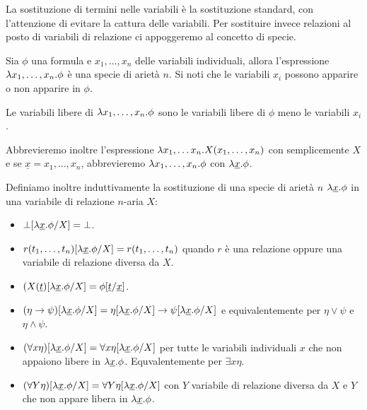 \documentclass[]{marticle}
\begin{document}
La sostituzione di termini nelle variabili \`e la sostituzione standard, con
l'attenzione di evitare la cattura delle variabili. Per sostituire invece
relazioni al posto di variabili di relazione ci appoggeremo al concetto di
specie.

\begin{block}[Definizione]
    Sia $\phi$ una formula e $x_1, \dots, x_n$ delle variabili individuali,
    allora l'espressione $\lambda x_1, \dots, x_n.\phi$ \`e una specie di ariet\`a
    $n$. Si noti che le variabili $x_i$ possono apparire o non apparire in
    $\phi$. 

    Le variabili libere di $\lambda x_1, \dots, x_n.\phi$ sono le variabili libere di
    $\phi$ meno le variabili $x_i$.

    Abbrevieremo inoltre l'espressione $\lambda x_1, \dots x_n.X(x_1, \dots, x_n)$
    con semplicemente $X$ e se $\underline{x}=x_1,\dots, x_n$, abbrevieremo $\lambda
    x_1, \dots, x_n.\phi$ con $\lambda\underline{x}.\phi$.

    Definiamo inoltre induttivamente la sostituzione di una specie di ariet\`a
    $n$ $\lambda\underline{x}.\phi$ in una variabile di relazione $n$-aria $X$:
    \begin{itemize}
        \item $\bot[\lambda\underline{x}.\phi/X] = \bot$.
        \item $r(t_1, \dots, t_n)[\lambda\underline{x}.\phi/X] = r(t_1, \dots,
            t_n)$ quando $r$ \`e una relazione oppure una variabile di relazione
            diversa da $X$.
        \item $(X(\underline{t})[\lambda\underline{x}.\phi/X] =
            \phi[\underline{t}/\underline{x}]$.
        \item $(\eta\rightarrow\psi)[\lambda\underline{x}.\phi/X] =
            \eta[\lambda\underline{x}.\phi/X] \rightarrow
            \psi[\lambda\underline{x}.\phi/X]$
            e equivalentemente per $\eta\lor\psi$ e $\eta\land\psi$.
        \item $(\forall x \eta)[\lambda\underline{x}.\phi/X] = \forall x
            \eta[\lambda\underline{x}.\phi/X]$ per tutte le variabili
            individuali $x$ che non appaiono libere in $\lambda\underline{x}.\phi$.
            Equvalentemente per $\exists x \eta$.
        \item $(\forall Y \eta)[\lambda\underline{x}.\phi/X] = \forall Y
            \eta[\lambda\underline{x}.\phi/X]$ con $Y$ variabile di relazione
            diversa da $X$ e $Y$ che non appare libera in
            $\lambda\underline{x}.\phi$.
    \end{itemize}
\end{block}
\end{document}
